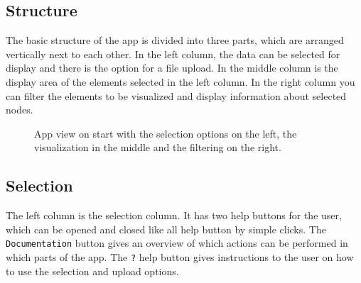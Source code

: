 \documentclass[pdftex,12pt,a4paper]{report}
\begin{document}
\subsection{Structure}
The basic structure of the app is divided into three parts, which are arranged vertically next to each other. In the left column, the data can be selected for display and there is the option for a file upload. In the middle column is the display area of the elements selected in the left column. In the right column you can filter the elements to be visualized and display information about selected nodes. 

\begin{figure}[!ht]
\begin{center}
	\caption{App view on start with the selection options on the left, the visualization in the middle and the filtering on the right.}
	\label{webapp}
\end{center}
\end{figure}

\subsection{Selection}
The left column is the selection column. It has two help buttons for the user, which can be opened and closed like all help button by simple clicks. The \texttt{Documentation} button gives an overview of which actions can be performed in which parts of the app.
The \texttt{?} help button gives instructions to the user on how to use the selection and upload options.
\end{document}
